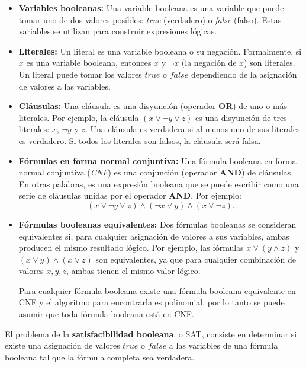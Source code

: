 \begin{itemize}
  \item \textbf{Variables booleanas:}
        Una variable booleana es una variable que puede tomar uno de dos valores posibles: \textit{true} (verdadero) o \textit{false} (falso). Estas variables se utilizan para construir expresiones lógicas.
  \item \textbf{Literales:}
        Un literal es una variable booleana o su negación. Formalmente, si \( x \) es una variable booleana, entonces \( x \) y \( \neg x \) (la negación de \( x \)) son literales. Un literal puede tomar los valores \( true \) o \( false \) dependiendo de la asignación de valores a las variables.
  \item  \textbf{Cláusulas:}
        Una cláusula es una disyunción (operador \textbf{OR}) de uno o más literales. Por ejemplo, la cláusula \( (x \vee \neg y \vee z) \) es una disyunción de tres literales: \( x \), \( \neg y \) y \( z \). Una cláusula es verdadera si al menos uno de sus literales es verdadero. Si todos los literales son falsos, la cláusula será falsa.
  \item \textbf{Fórmulas en forma normal conjuntiva:}
        Una fórmula booleana en forma normal conjuntiva (\textit{CNF}) es una conjunción (operador \textbf{AND}) de cláusulas. En otras palabras, es una expresión booleana que se puede escribir como una serie de cláusulas unidas por el operador \textbf{AND}. Por ejemplo:        
        \[
          (x \vee \neg y \vee z) \wedge (\neg x \vee y) \wedge (x \vee \neg z).
        \]
  \item \textbf{Fórmulas booleanas equivalentes:}
        Dos fórmulas booleanas se consideran equivalentes si, para cualquier asignación de valores a sus variables, ambas producen el mismo resultado lógico. Por ejemplo, las fórmulas \( x \vee (y \wedge z) \) y \( (x \vee y) \wedge (x \vee z) \) son equivalentes, ya que para cualquier combinación de valores \( x, y, z \), ambas tienen el mismo valor lógico.
        
        Para cualquier fórmula booleana existe una fórmula booleana equivalente en CNF \cite{authomataTheory} y 
        el algoritmo para encontrarla es polinomial, por lo tanto se puede asumir que toda fórmula booleana está en CNF.
        
\end{itemize}

\begin{definition}  
  El problema de la \textbf{satisfacibilidad booleana}, o SAT, consiste en determinar si existe una asignación de valores \( true \) o \( false \) a las variables de una fórmula booleana tal que la fórmula completa sea verdadera. 
\end{definition}

